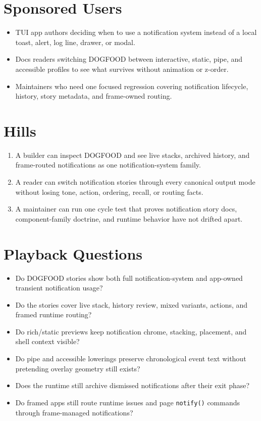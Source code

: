 \section{Sponsored Users}\label{record-103-sponsored-users}

\begin{itemize}
\tightlist
\item
  TUI app authors deciding when to use a notification system instead of a local toast, alert, log line, drawer, or modal.
\item
  Docs readers switching DOGFOOD between interactive, static, pipe, and accessible profiles to see what survives without animation or z-order.
\item
  Maintainers who need one focused regression covering notification lifecycle, history, story metadata, and frame-owned routing.
\end{itemize}

\section{Hills}\label{record-103-hills}

\begin{enumerate}
\def\labelenumi{\arabic{enumi}.}
\tightlist
\item
  A builder can inspect DOGFOOD and see live stacks, archived history, and frame-routed notifications as one notification-system family.
\item
  A reader can switch notification stories through every canonical output mode without losing tone, action, ordering, recall, or routing facts.
\item
  A maintainer can run one cycle test that proves notification story docs, component-family doctrine, and runtime behavior have not drifted apart.
\end{enumerate}

\section{Playback Questions}\label{record-103-playback-questions}

\begin{itemize}
\tightlist
\item
  Do DOGFOOD stories show both full notification-system and app-owned transient notification usage?
\item
  Do the stories cover live stack, history review, mixed variants, actions, and framed runtime routing?
\item
  Do rich/static previews keep notification chrome, stacking, placement, and shell context visible?
\item
  Do pipe and accessible lowerings preserve chronological event text without pretending overlay geometry still exists?
\item
  Does the runtime still archive dismissed notifications after their exit phase?
\item
  Do framed apps still route runtime issues and page \texttt{n\allowbreak{}o\allowbreak{}t\allowbreak{}i\allowbreak{}f\allowbreak{}y\allowbreak{}(\allowbreak{})} commands through frame-managed notifications?
\end{itemize}


